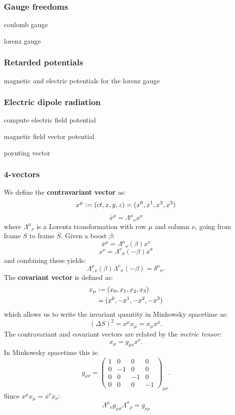 \documentclass{article}
\newcommand{\deq}{\vcentcolon=}
\begin{document}
\begin{multicols*}{3}
\subsubsection*{Gauge freedoms}
coulomb gauge

lorenz gauge

\subsubsection*{Retarded potentials}
magnetic and electric potentials for the lorenz gauge

\subsubsection*{Electric dipole radiation}
compute electric field potential

magnetic field vector potential

poynting vector

\newcolumn

\subsubsection*{4-vectors}
We define the \textbf{contravariant vector} as:
$$x^{\mu}\deq(ct,x,y,z)=(x^0,x^1,x^2,x^3)$$
$$\overline{x}^{\mu}=\Lambda^{\mu}{}_\nu x^{\nu}$$
where $\Lambda^{\mu}{}_\nu$ is a Lorentz transformation
with row $\mu$ and column $\nu$, going from frame $S$ to
frame $\overline{S}$. Given a boost $\beta$:
$$\overline{x}^{\mu}=\Lambda^{\mu}{}_\nu(\beta) x^{\nu}$$
$$x^{\nu}=\Lambda^{\nu}{}_{\sigma}(-\beta)\overline{x}^{\sigma}$$
and combining these yields:
$$\Lambda^{\mu}{}_\nu(\beta)\Lambda^{\nu}{}_{\sigma}(-\beta)
=\delta^{\mu}{}_\sigma.$$
The \textbf{covariant vector} is defined as:
\begin{align*}
    x_{\mu}
    &\deq(x_0,x_1,x_2,x_3) \\
    &=(x^0,-x^1,-x^2,-x^3)
\end{align*}
which allows us to write the invariant quantity in
Minkowsky spacetime as:
$$(\Delta S)^2=x^{\mu}x_{\mu}=x_{\mu}x^{\mu}.$$
The contravariant and covariant vectors
are related by the \textit{metric tensor}:
$$x_{\mu}=g_{\mu\nu}x^{\nu}.$$
In Minkowsky spacetime this is:
$$g_{\mu\nu}=\begin{pmatrix}
1 & 0 & 0 & 0 \\ 0 & -1 & 0 & 0 \\
0 & 0 & -1 & 0 \\ 0 & 0 & 0 & -1\end{pmatrix}_{\mu\nu}.$$
Since $x^{\mu}x_{\mu}=\overline{x}^{\nu}\overline{x}_{\nu}$:
$$\Lambda^{\mu}{}_{\nu}g_{\mu\sigma}\Lambda^{\sigma}{}_{\rho}
=g_{\nu\rho}$$


\end{multicols*}
\end{document}
